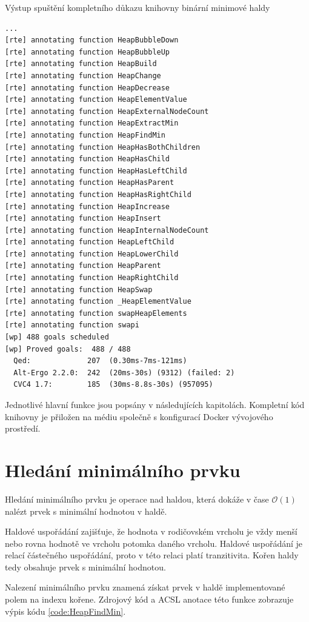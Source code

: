 \begin{listing}[H]
	\caption{Výstup spuštění kompletního důkazu knihovny binární minimové haldy}
	\label{shell:run-frama-c-proofs-output}
	\begin{verbatim}
...
[rte] annotating function HeapBubbleDown
[rte] annotating function HeapBubbleUp
[rte] annotating function HeapBuild
[rte] annotating function HeapChange
[rte] annotating function HeapDecrease
[rte] annotating function HeapElementValue
[rte] annotating function HeapExternalNodeCount
[rte] annotating function HeapExtractMin
[rte] annotating function HeapFindMin
[rte] annotating function HeapHasBothChildren
[rte] annotating function HeapHasChild
[rte] annotating function HeapHasLeftChild
[rte] annotating function HeapHasParent
[rte] annotating function HeapHasRightChild
[rte] annotating function HeapIncrease
[rte] annotating function HeapInsert
[rte] annotating function HeapInternalNodeCount
[rte] annotating function HeapLeftChild
[rte] annotating function HeapLowerChild
[rte] annotating function HeapParent
[rte] annotating function HeapRightChild
[rte] annotating function HeapSwap
[rte] annotating function _HeapElementValue
[rte] annotating function swapHeapElements
[rte] annotating function swapi
[wp] 488 goals scheduled
[wp] Proved goals:  488 / 488
  Qed:             207  (0.30ms-7ms-121ms)
  Alt-Ergo 2.2.0:  242  (20ms-30s) (9312) (failed: 2)
  CVC4 1.7:        185  (30ms-8.8s-30s) (957095)
	\end{verbatim}
\end{listing}

Jednotlivé hlavní funkce jsou popsány v následujících kapitolách. Kompletní kód knihovny je přiložen na médiu společně s konfigurací Docker vývojového prostředí.

\section{Hledání minimálního prvku}
\label{subsec:HeapFindMin}

Hledání minimálního prvku je operace nad haldou, která dokáže v čase $\mathcal{O}(1)$ nalézt prvek s minimální hodnotou v haldě.

Haldové uspořádání zajišťuje, že hodnota v rodičovském vrcholu je vždy menší nebo rovna hodnotě ve vrcholu potomka daného vrcholu. Haldové uspořádání je relací částečného uspořádání, proto v této relaci platí tranzitivita. Kořen haldy tedy obsahuje prvek s minimální hodnotou.

Nalezení minimálního prvku znamená získat prvek v haldě implementované polem na indexu kořene. Zdrojový kód a ACSL anotace této funkce zobrazuje výpis kódu \ref{code:HeapFindMin}.

